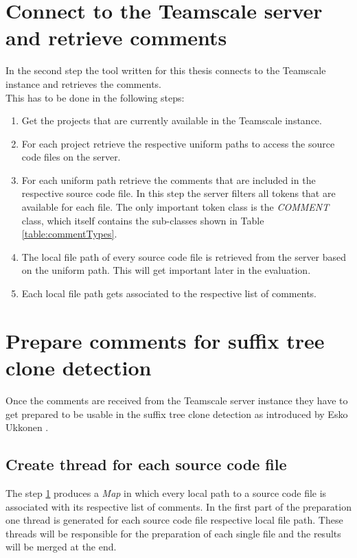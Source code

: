 \section{Connect to the Teamscale server and retrieve comments}
\label{section:retrieveComments}
In the second step the tool written for this thesis connects to the Teamscale instance and retrieves the comments.\\
This has to be done in the following steps:
\begin{enumerate}
	\item Get the projects that are currently available in the Teamscale instance. 
	\item For each project retrieve the respective uniform paths to access the source code files on the server.
	\item For each uniform path retrieve the comments that are included in the respective source code file. In this step the server filters all tokens that are available for each file. The only important token class is the \textit{COMMENT} class, which itself contains the sub-classes shown in Table \ref{table:commentTypes}.
	\item The local file path of every source code file is retrieved from the server based on the uniform path. This will get important later in the evaluation.
	\item Each local file path gets associated to the respective list of comments.
\end{enumerate}




\section{Prepare comments for suffix tree clone detection}
Once the comments are received from the Teamscale server instance they have to get prepared to be usable in the suffix tree clone detection as introduced by Esko Ukkonen \cite{Ukkonen1995}\cite{Ukkonen1993}.\\
\subsection{Create thread for each source code file}
The step \ref{section:retrieveComments} produces a \textit{Map} in which every local path to a source code file is associated with its respective list of comments.
In the first part of the preparation one thread is generated for each source code file respective local file path. These threads will be responsible for the preparation of each single file and the results will be merged at the end.

